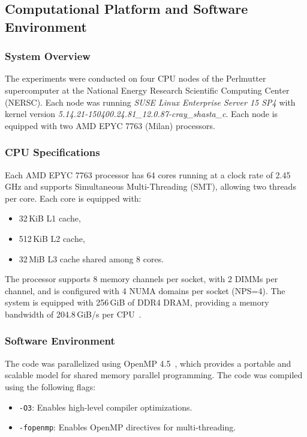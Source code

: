 \subsection{Computational Platform and Software Environment}
\label{subsec:computational-platform-and-software-environment}

\subsubsection{System Overview}
The experiments were conducted on four CPU nodes of the Perlmutter supercomputer at the National Energy Research Scientific Computing Center (NERSC). Each node was running \textit{SUSE Linux Enterprise Server 15 SP4} with kernel version \textit{5.14.21-150400.24.81\_12.0.87-cray\_shasta\_c}. Each node is equipped with two AMD EPYC 7763 (Milan) processors.

\subsubsection{CPU Specifications}
Each AMD EPYC 7763 processor has 64 cores running at a clock rate of 2.45\,GHz and supports Simultaneous Multi-Threading (SMT), allowing two threads per core. Each core is equipped with:
\begin{itemize}
    \item 32\,KiB L1 cache,
    \item 512\,KiB L2 cache,
    \item 32\,MiB L3 cache shared among 8 cores.
\end{itemize}
The processor supports 8 memory channels per socket, with 2 DIMMs per channel, and is configured with 4 NUMA domains per socket (NPS=4). The system is equipped with 256\,GiB of DDR4 DRAM, providing a memory bandwidth of 204.8\,GiB/s per CPU~\cite{nersc_perlmutter_architecture, amd_epyc_tuning_guide}.

\subsubsection{Software Environment}
The code was parallelized using OpenMP 4.5~\cite{openmp_spec}, which provides a portable and scalable model for shared memory parallel programming. The code was compiled using the following flags:
\begin{itemize}
    \item \texttt{-O3}: Enables high-level compiler optimizations.
    \item \texttt{-fopenmp}: Enables OpenMP directives for multi-threading.
\end{itemize}

